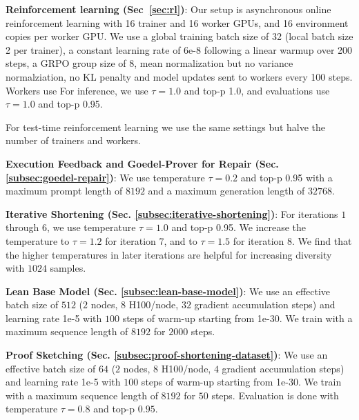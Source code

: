 \textbf{Reinforcement learning (Sec~\ref{sec:rl})}: Our setup is asynchronous online reinforcement learning with 16 trainer and 16 worker GPUs, and 16 environment copies per worker GPU. We use a global training batch size of 32 (local batch size 2 per trainer), a constant learning rate of 6e-8 following a linear warmup over 200 steps, a GRPO group size of 8, mean normalization but no variance normalziation, no KL penalty and model updates sent to workers every 100 steps. Workers use  For inference, we use $\tau=1.0$ and top-p 1.0, and evaluations use $\tau=1.0$ and top-p 0.95.

For test-time reinforcement learning we use the same settings but halve the number of trainers and workers.

\textbf{Execution Feedback and Goedel-Prover for Repair (Sec. \ref{subsec:goedel-repair})}: We use temperature $\tau=0.2$ and top-p 0.95 with a maximum prompt length of $8192$ and a maximum generation length of $32768$.

\textbf{Iterative Shortening (Sec. \ref{subsec:iterative-shortening})}: For iterations $1$ through $6$, we use temperature $\tau=1.0$ and top-p 0.95. We increase the temperature to $\tau=1.2$ for iteration 7, and to $\tau=1.5$ for iteration 8. We find that the higher temperatures in later iterations are helpful for increasing diversity with $1024$ samples. 


\textbf{Lean Base Model (Sec. \ref{subsec:lean-base-model})}: We use an effective batch size of $512$ ($2$ nodes, $8$ H100/node, $32$ gradient accumulation steps) and learning rate 1e-5 with $100$ steps of warm-up starting from 1e-30. We train with a maximum sequence length of $8192$ for $2000$ steps.

\textbf{Proof Sketching (Sec. \ref{subsec:proof-shortening-dataset})}: We use an effective batch size of $64$ ($2$ nodes, $8$ H100/node, $4$ gradient accumulation steps) and learning rate 1e-5 with $100$ steps of warm-up starting from 1e-30. We train with a maximum sequence length of $8192$ for $50$ steps. Evaluation is done with temperature $\tau=0.8$ and top-p $0.95$.

